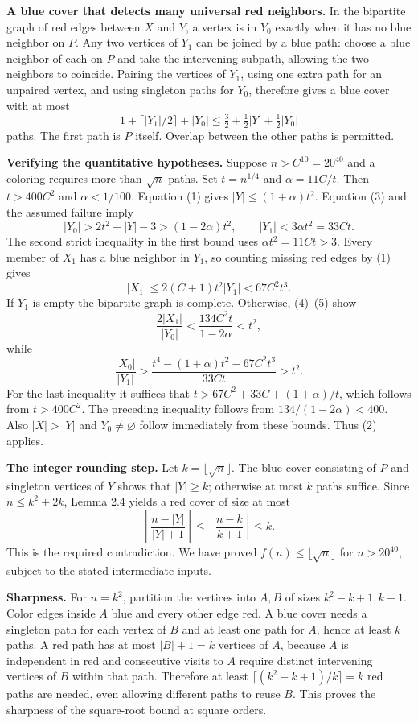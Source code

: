 \textbf{A blue cover that detects many universal red neighbors.} In the bipartite graph of red edges between $X$ and $Y$, a vertex is in $Y_0$ exactly when it has no blue neighbor on $P$. Any two vertices of $Y_1$ can be joined by a blue path: choose a blue neighbor of each on $P$ and take the intervening subpath, allowing the two neighbors to coincide. Pairing the vertices of $Y_1$, using one extra path for an unpaired vertex, and using singleton paths for $Y_0$, therefore gives a blue cover with at most
\[
 1+\lceil |Y_1|/2\rceil+|Y_0|
 \leq\tfrac32+\tfrac12|Y|+\tfrac12|Y_0|               \tag{3}
\]
paths. The first path is $P$ itself. Overlap between the other paths is permitted.

\textbf{Verifying the quantitative hypotheses.} Suppose $n>C^{10}=20^{40}$ and a coloring requires more than $\sqrt n$ paths. Set $t=n^{1/4}$ and $\alpha=11C/t$. Then $t>400C^2$ and $\alpha<1/100$. Equation (1) gives $|Y|\leq(1+\alpha)t^2$. Equation (3) and the assumed failure imply
\[
 |Y_0|>2t^2-|Y|-3>(1-2\alpha)t^2,
 \qquad |Y_1|<3\alpha t^2=33Ct.                      \tag{4}
\]
The second strict inequality in the first bound uses $\alpha t^2=11Ct>3$. Every member of $X_1$ has a blue neighbor in $Y_1$, so counting missing red edges by (1) gives
\[
 |X_1|\leq2(C+1)t^2|Y_1|<67C^2t^3.                  \tag{5}
\]
If $Y_1$ is empty the bipartite graph is complete. Otherwise, (4)--(5) show
\[
 \frac{2|X_1|}{|Y_0|}<\frac{134C^2t}{1-2\alpha}<t^2,
\]
while
\[
 \frac{|X_0|}{|Y_1|}
 >\frac{t^4-(1+\alpha)t^2-67C^2t^3}{33Ct}>t^2.
\]
For the last inequality it suffices that
$t>67C^2+33C+(1+\alpha)/t$, which follows from $t>400C^2$. The preceding inequality follows from $134/(1-2\alpha)<400$. Also $|X|>|Y|$ and $Y_0\ne\varnothing$ follow immediately from these bounds. Thus (2) applies.

\textbf{The integer rounding step.} Let $k=\lfloor\sqrt n\rfloor$. The blue cover consisting of $P$ and singleton vertices of $Y$ shows that $|Y|\geq k$; otherwise at most $k$ paths suffice. Since $n\leq k^2+2k$, Lemma 2.4 yields a red cover of size at most
\[
 \left\lceil\frac{n-|Y|}{|Y|+1}\right\rceil
 \leq\left\lceil\frac{n-k}{k+1}\right\rceil\leq k.
\]
This is the required contradiction. We have proved $f(n)\leq\lfloor\sqrt n\rfloor$ for $n>20^{40}$, subject to the stated intermediate inputs.

\textbf{Sharpness.} For $n=k^2$, partition the vertices into $A,B$ of sizes $k^2-k+1,k-1$. Color edges inside $A$ blue and every other edge red. A blue cover needs a singleton path for each vertex of $B$ and at least one path for $A$, hence at least $k$ paths. A red path has at most $|B|+1=k$ vertices of $A$, because $A$ is independent in red and consecutive visits to $A$ require distinct intervening vertices of $B$ within that path. Therefore at least $\lceil(k^2-k+1)/k\rceil=k$ red paths are needed, even allowing different paths to reuse $B$. This proves the sharpness of the square-root bound at square orders.

